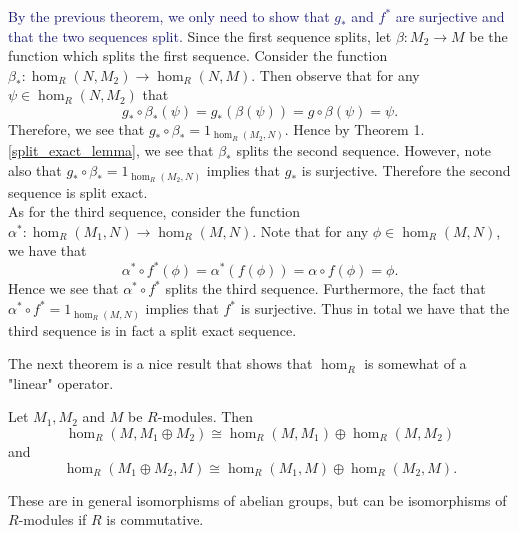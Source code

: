 \begin{prf}
    \textcolor{MidnightBlue}{By the previous theorem, we only need
    to show that $g_*$ and $f^*$ are surjective and that the two
    sequences split.
    }
    Since the first sequence splits, let $\beta: M_2 \to M$ be the
    function which splits the first sequence. Consider the
    function $\beta_*:
    \hom_R(N, M_2) \to \hom_R(N, M)$. 
    Then observe that for any $\psi \in \hom_R(N, M_2)$ that 
    \[
        g_* \circ \beta_* (\psi) = g_*(\beta(\psi)) = g \circ \beta(\psi) 
        = \psi.
    \]
    Therefore, we see that $g_* \circ \beta_* = 1_{\hom_R(M_{2}, N)}.$ Hence by
    Theorem 1.\ref{split_exact_lemma}, we see that $\beta_*$
    splits the second sequence. However, note also that $g_* \circ
    \beta_* = 1_{\hom_R(M_{2}, N)}$ implies that $g_*$ is surjective. Therefore
    the second sequence is split exact.
    \\

    As for the third sequence, consider the function $\alpha^*:
    \hom_R(M_1, N) \to \hom_R(M, N)$. Note that for any $\phi \in
    \hom_R(M, N)$, we have that 
    \[
        \alpha^* \circ f^*(\phi) = \alpha^*(f(\phi)) = \alpha \circ f(\phi) = \phi.
    \]
    Hence we see that $\alpha^* \circ f^*$ splits the third
    sequence. Furthermore, the fact that $\alpha^* \circ f^* =
    1_{\hom_R(M, N)}$ implies that $f^*$ is surjective. Thus in total
    we have that the third sequence is in fact a split exact sequence.
\end{prf}

The next theorem is a nice result that shows that $\hom_R$ is
somewhat of a "linear" operator.
\begin{thm}
    Let $M_1, M_2$ and $M$ be $R$-modules. Then 
    \[
        \hom_R(M, M_1\oplus M_2) \cong \hom_R(M, M_1)\oplus \hom_R(M, M_2)   
    \]
    and 
    \[
        \hom_R(M_1 \oplus M_2, M) \cong \hom_R(M_1, M) \oplus \hom_R(M_2, M).
    \]  
    \vspace{-0.7cm}
\end{thm}
These are in general isomorphisms of abelian groups, but can
be isomorphisms of $R$-modules if $R$ is commutative.

